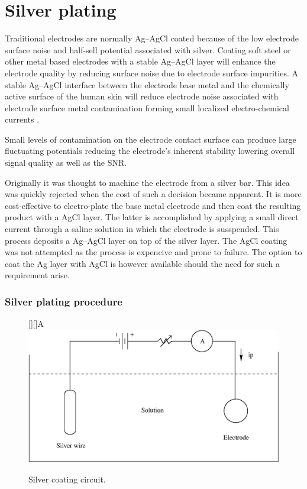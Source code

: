 \appendix
\chapter{Silver plating } \label{appendix:plating}
Traditional electrodes are normally Ag--AgCl coated because of the low
electrode surface noise and half-sell potential associated with
silver. Coating soft steel or other metal based electrodes with a
stable Ag--AgCl layer will enhance the electrode quality by reducing
surface noise due to electrode surface impurities. A stable Ag--AgCl
interface between the electrode base metal and the chemically active
surface of the human skin will reduce electrode noise associated with
electrode surface metal contamination forming small localized
electro-chemical currents \cite{electrode-stability}.

Small levels of contamination on the electrode contact surface can
produce large fluctuating potentials reducing the electrode's inherent
stability lowering overall signal quality as well as the SNR.

Originally it was thought to machine the electrode from a silver
bar. This idea was quickly rejected when the cost of such a decision
became apparent. It is more cost-effective to electro-plate the base
metal electrode and then coat the resulting product with a AgCl
layer. The latter is accomplished by applying a small direct current
through a saline solution in which the electrode is susspended. This
process deposits a Ag--AgCl layer on top of the silver layer. The AgCl
coating was not attempted as the process is expencive and prone to
failure. The option to coat the Ag layer with AgCl is however available
should the need for such a requirement arise.


\subsection{Silver plating procedure}
\begin{figure}[htbp]
		[][]{A}
		\psfrag{-}{--}
		\psfrag{+}{+}
        \includegraphics[width=\textwidth]{silver.eps}
        \caption{Silver coating circuit.}
        \label{fig:silver}
\end{figure}

